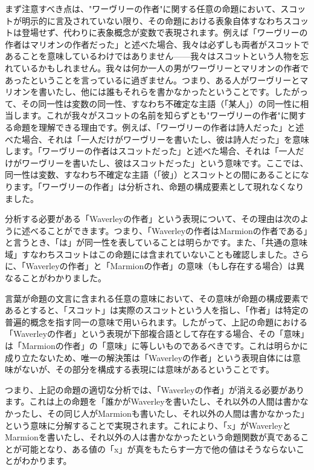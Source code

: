 \documentclass[a4paper,11pt,openany]{ltjsbook}
\begin{document}
まず注意すべき点は、"ワーヴリーの作者"に関する任意の命題において、スコットが明示的に言及されていない限り、その命題における表象自体すなわちスコットは登場せず、代わりに表象概念が変数で表現されます。例えば「ワーヴリーの作者はマリオンの作者だった」と述べた場合、我々は必ずしも両者がスコットであることを意味しているわけではありません——我々はスコットという人物を忘れているかもしれません。我々は何か一人の男がワーヴリーとマリオンの作者であったということを言っているに過ぎません。つまり、ある人がワーヴリーとマリオンを書いたし、他には誰もそれらを書かなかったということです。したがって、その同一性は変数の同一性、すなわち不確定な主語（「某人」）の同一性に相当します。これが我々がスコットの名前を知らずとも"ワーヴリーの作者"に関する命題を理解できる理由です。例えば、「ワーヴリーの作者は詩人だった」と述べた場合、それは「一人だけがワーヴリーを書いたし、彼は詩人だった」を意味します。「ワーヴリーの作者はスコットだった」と述べた場合、それは「一人だけがワーヴリーを書いたし、彼はスコットだった」という意味です。ここでは、同一性は変数、すなわち不確定な主語（「彼」）とスコットとの間にあることになります。「ワーヴリーの作者」は分析され、命題の構成要素として現れなくなりました。


分析する必要がある「Waverleyの作者」という表現について、その理由は次のように述べることができます。つまり、「Waverleyの作者はMarmionの作者である」と言うとき、「は」が同一性を表していることは明らかです。また、「共通の意味域」すなわちスコットはこの命題には含まれていないことも確認しました。さらに、「Waverleyの作者」と「Marmionの作者」の意味（もし存在する場合）は異なることがわかりました。

言葉が命題の文言に含まれる任意の意味において、その意味が命題の構成要素であるとすると、「スコット」は実際のスコットという人を指し、「作者」は特定の普遍的概念を指す同一の意味で用いられます。したがって、上記の命題における「Waverleyの作者」という表現が下部複合語として存在する場合、その「意味」は「Marmionの作者」の「意味」に等しいものであるべきです。これは明らかに成り立たないため、唯一の解決策は「Waverleyの作者」という表現自体には意味がないが、その部分を構成する表現には意味があるということです。

つまり、上記の命題の適切な分析では、「Waverleyの作者」が消える必要があります。これは上の命題を「誰かがWaverleyを書いたし、それ以外の人間は書かなかったし、その同じ人がMarmionも書いたし、それ以外の人間は書かなかった」という意味に分解することで実現されます。これにより、「x」がWaverleyとMarmionを書いたし、それ以外の人は書かなかったという命題関数が真であることが可能となり、ある値の「x」が真をもたらす一方で他の値はそうならないことがわかります。
\end{document}
